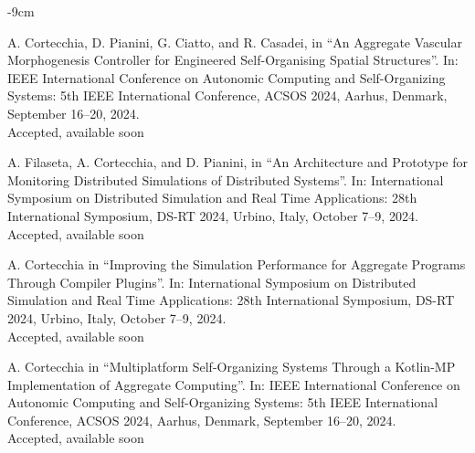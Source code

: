 \documentclass[10pt,a4paper]{altacv}
\begin{document}
\begin{adjustwidth}{}{-9cm}

    A. Cortecchia, D. Pianini, G. Ciatto, and R. Casadei, in
    ``An Aggregate Vascular Morphogenesis Controller for Engineered Self-Organising Spatial Structures''.
    In: IEEE International Conference on Autonomic Computing and Self-Organizing Systems: 5th IEEE International Conference, ACSOS 2024, Aarhus, Denmark, September 16–20, 2024.\\
    {\small \notesymbol \hspace{0.5em} Accepted, available soon}\\

    \divider

    A. Filaseta, A. Cortecchia, and D. Pianini, in
    ``An Architecture and Prototype for Monitoring Distributed Simulations of Distributed Systems''.
    In: International Symposium on Distributed Simulation and Real Time Applications: 28th International Symposium, DS-RT 2024, Urbino, Italy, October 7–9, 2024.\\
    {\small \notesymbol \hspace{0.5em} Accepted, available soon}\\

    \divider

    A. Cortecchia in
    ``Improving the Simulation Performance for Aggregate Programs Through Compiler Plugins''.
    In: International Symposium on Distributed Simulation and Real Time Applications: 28th International Symposium, DS-RT 2024, Urbino, Italy, October 7–9, 2024.\\
    {\small \notesymbol \hspace{0.5em} Accepted, available soon}\\

    \divider

    A. Cortecchia in
    ``Multiplatform Self-Organizing Systems Through a Kotlin-MP Implementation of Aggregate Computing''.
    In: IEEE International Conference on Autonomic Computing and Self-Organizing Systems: 5th IEEE International Conference, ACSOS 2024, Aarhus, Denmark, September 16–20, 2024.\\
    {\small \notesymbol \hspace{0.5em} Accepted, available soon}\\

    \divider

\end{adjustwidth}
\end{document}
